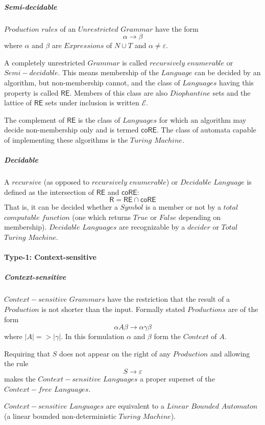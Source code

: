 \documentclass{article}
\begin{document}
    \subparagraph{Semi-decidable}
    $Production$ $rules$ of an $Unrestricted$ $Grammar$ have the form
    \[
        \alpha \rightarrow \beta
    \]
    where $\alpha$ and $\beta$ are $Expressions$ of $N \cup T$ and
    $\alpha \neq \varepsilon$.

    A completely unrestricted $Grammar$ is called $recursively$
    $enumerable$ or $Semi-decidable$. This means membership of the
    $Language$ can be decided by an algorithm, but non-membership
    cannot, and the class of $Languages$ having this property is
    called $\mathsf{RE}$. Members of this class are also $Diophantine$
    sets and the lattice of $\mathsf{RE}$ sets under inclusion is
    written $\mathcal{E}$.

    The complement of $\mathsf{RE}$ is the class of $Languages$ for
    which an algorithm may decide non-membership only and is termed
    $\mathsf{coRE}$. The class of automata capable of implementing
    these algorithms is the $Turing$ $Machine$.

    \subparagraph{Decidable}
    A $recursive$ (as opposed to $recursively$ $enumerable$) or
    $Decidable$ $Language$ is defined as the intersection of
    $\mathsf{RE}$ and $\mathsf{coRE}$:
    \[
        \mathsf{R} = \mathsf{RE} \cap \mathsf{coRE}
    \]
    That is, it can be decided whether a $Symbol$ is a member or not
    by a $total$ $computable$ $function$ (one which returns $True$ or
    $False$ depending on membership). $Decidable$ $Languages$ are
    recognizable by a $decider$ or $Total$ $Turing$ $Machine$.

\paragraph{Type-1: Context-sensitive}

    \subparagraph{Context-sensitive}
    $Context-sensitive$ $Grammars$ have the restriction that the
    result of a $Production$ is not shorter than the input. Formally
    stated $Productions$ are of the form
    \[
        \alpha A \beta \rightarrow \alpha \gamma \beta
    \]
    where $|A| => |\gamma|$. In this formulation $\alpha$ and $\beta$
    form the $Context$ of $A$.

    Requiring that $S$ does not appear on the right of any
    $Production$ and allowing the rule
    \[
        S \rightarrow \varepsilon
    \]
    makes the $Context-sensitive$ $Languages$ a proper superset of the
    $Context-free$ $Languages$.

    $Context-sensitive$ $Languages$ are equivalent to a $Linear$
    $Bounded$ $Automaton$ (a linear bounded non-deterministic $Turing$
    $Machine$).
\end{document}
